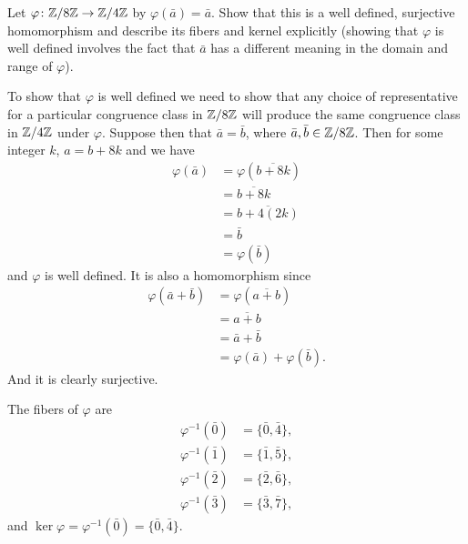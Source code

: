  Let $\varphi\colon\mathbb{Z}/8\mathbb{Z}\to\mathbb{Z}/4\mathbb{Z}$ by
$\varphi(\bar a) = \bar a$. Show that this is a well defined,
surjective homomorphism and describe its fibers and kernel explicitly
(showing that $\varphi$ is well defined involves the fact that
$\bar a$ has a different meaning in the domain and range of
$\varphi$).
\begin{solution}
  To show that $\varphi$ is well defined we need to show that any
  choice of representative for a particular congruence class in
  $\mathbb{Z}/8\mathbb{Z}$ will produce the same congruence class in $\mathbb{Z}/4\mathbb{Z}$ under
  $\varphi$. Suppose then that $\bar a = \bar b$, where
  $\bar a,\bar b\in\mathbb{Z}/8\mathbb{Z}$. Then for some integer $k$, $a = b + 8k$
  and we have
  \begin{align*}
    \varphi(\bar a)
    &= \varphi(\overline{b + 8k}) \\
    &= \overline{b + 8k} \\
    &= \overline{b + 4(2k)} \\
    &= \bar b \\
    &= \varphi(\bar b)
  \end{align*}
  and $\varphi$ is well defined. It is also a homomorphism since
  \begin{align*}
    \varphi(\bar a + \bar b)
    &= \varphi(\overline{a + b}) \\
    &= \overline{a + b} \\
    &= \bar a + \bar b \\
    &= \varphi(\bar a) + \varphi(\bar b).
  \end{align*}
  And it is clearly surjective.

  The fibers of $\varphi$ are
  \begin{align*}
    \varphi^{-1}(\bar0) &= \{\bar0, \bar4\}, \\
    \varphi^{-1}(\bar1) &= \{\bar1, \bar5\}, \\
    \varphi^{-1}(\bar2) &= \{\bar2, \bar6\}, \\
    \varphi^{-1}(\bar3) &= \{\bar3, \bar7\},
  \end{align*}
  and $\ker\varphi = \varphi^{-1}(\bar0) = \{\bar0, \bar4\}$.
\end{solution}

